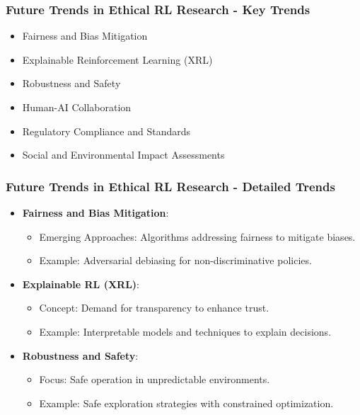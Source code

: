 \documentclass{beamer}
\begin{document}
\begin{frame}[fragile]
    \frametitle{Future Trends in Ethical RL Research - Key Trends}
    \begin{itemize}
        \item Fairness and Bias Mitigation
        \item Explainable Reinforcement Learning (XRL)
        \item Robustness and Safety
        \item Human-AI Collaboration
        \item Regulatory Compliance and Standards
        \item Social and Environmental Impact Assessments
    \end{itemize}
\end{frame}

\begin{frame}[fragile]
    \frametitle{Future Trends in Ethical RL Research - Detailed Trends}
    \begin{itemize}
        \item \textbf{Fairness and Bias Mitigation}:
            \begin{itemize}
                \item Emerging Approaches: Algorithms addressing fairness to mitigate biases.
                \item Example: Adversarial debiasing for non-discriminative policies.
            \end{itemize}
        
        \item \textbf{Explainable RL (XRL)}:
            \begin{itemize}
                \item Concept: Demand for transparency to enhance trust.
                \item Example: Interpretable models and techniques to explain decisions.
            \end{itemize}
        
        \item \textbf{Robustness and Safety}:
            \begin{itemize}
                \item Focus: Safe operation in unpredictable environments.
                \item Example: Safe exploration strategies with constrained optimization.
            \end{itemize}
    \end{itemize}
\end{frame}
\end{document}

